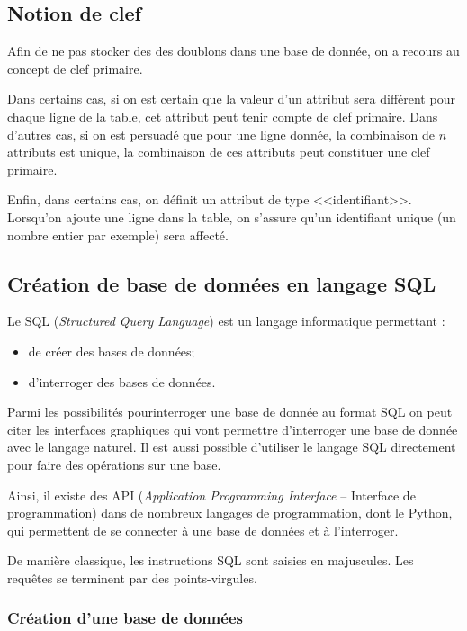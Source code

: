\documentclass[10pt]{article}
\begin{document}
\subsection{Notion de clef}
Afin de ne pas stocker des des doublons dans une base de donnée, on a recours au concept de clef primaire. 

Dans certains cas, si on est certain que la valeur d'un attribut sera différent pour chaque ligne de la table, cet attribut peut tenir compte de clef primaire. Dans d'autres cas, si on est persuadé que pour une ligne donnée, la combinaison de $n$ attributs est unique, la combinaison de ces attributs peut constituer une clef primaire. 

Enfin, dans certains cas, on définit un attribut de type <<identifiant>>. Lorsqu'on ajoute une ligne dans la table, on s'assure qu'un identifiant unique (un nombre entier par exemple) sera affecté.

\subsection{Création de base de données en langage SQL}
Le SQL (\textit{Structured Query Language}) est un langage informatique permettant :
\begin{itemize}
\item de créer des bases de données;
\item d'interroger des bases de données.
\end{itemize}

Parmi les possibilités pourinterroger une base de donnée au format SQL on peut citer les interfaces graphiques qui vont permettre d'interroger une base de donnée avec le langage naturel. Il est aussi possible d'utiliser le langage SQL directement pour faire des opérations sur une base. 

\begin{exemple}
Ainsi, il existe des API (\textit{Application Programming Interface} -- Interface de programmation) dans de nombreux langages de programmation, dont le Python, qui permettent de se connecter à une base de données et à l'interroger. 

\end{exemple}

\begin{rem}
De manière classique, les instructions SQL sont saisies en majuscules. Les requêtes se terminent par des points-virgules.
\end{rem}

\subsubsection{Création d'une base de données}
\end{document}
